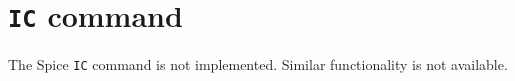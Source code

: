 \section{{\tt IC} command}
The Spice {\tt IC} command is not implemented.  Similar functionality is
not available.
